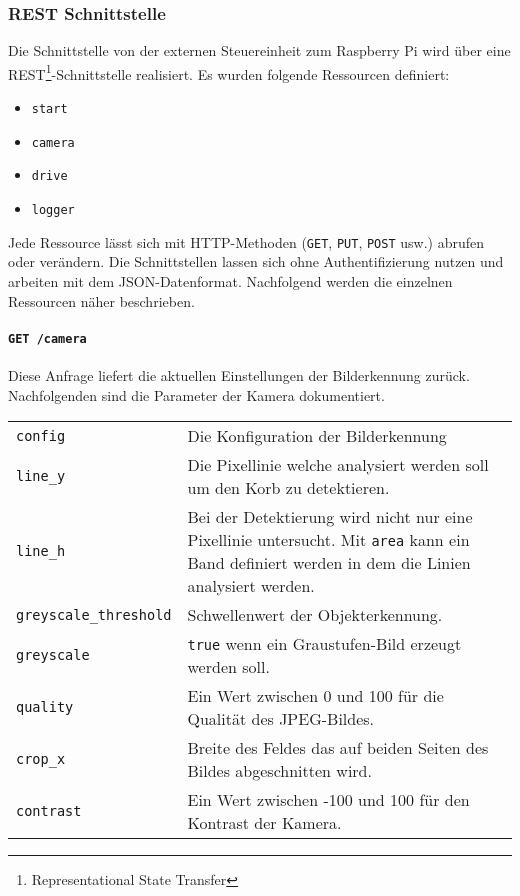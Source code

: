 \subsubsection{REST Schnittstelle}
\label{sec:rest-schnittstelle}

Die Schnittstelle von der externen Steuereinheit zum Raspberry Pi wird über eine REST\footnote{Representational State Transfer}-Schnittstelle realisiert. Es wurden folgende Ressourcen definiert:
\begin{itemize}
	\item \texttt{start}
	\item \texttt{camera}
	\item \texttt{drive}
	\item \texttt{logger}
\end{itemize}
Jede Ressource lässt sich mit HTTP-Methoden (\texttt{GET}, \texttt{PUT}, \texttt{POST} usw.) abrufen oder verändern. Die Schnittstellen lassen sich ohne Authentifizierung nutzen und arbeiten mit dem JSON-Datenformat. Nachfolgend werden die einzelnen Ressourcen näher beschrieben.

\paragraph{\texttt{GET /camera}}

Diese Anfrage liefert die aktuellen Einstellungen der Bilderkennung zurück. Nachfolgenden sind die Parameter der Kamera dokumentiert.
\label{tab:parameter-bilderkennung}
\begin{table}[h!]
	\begin{tabular}{l p{12cm}}
		\texttt{config} & Die Konfiguration der Bilderkennung \\
		\texttt{line\_y} & Die Pixellinie welche analysiert werden soll um den Korb zu detektieren. \\
		\texttt{line\_h} & Bei der Detektierung wird nicht nur eine Pixellinie untersucht. Mit \texttt{area} kann ein Band definiert werden in dem die Linien analysiert werden. \\
		\texttt{greyscale\_threshold} & Schwellenwert der Objekterkennung. \\
		\texttt{greyscale} & \texttt{true} wenn ein Graustufen-Bild erzeugt werden soll. \\
		\texttt{quality} & Ein Wert zwischen 0 und 100 für die Qualität des JPEG-Bildes. \\
		\texttt{crop\_x} & Breite des Feldes das auf beiden Seiten des Bildes abgeschnitten wird. \\
		\texttt{contrast} & Ein Wert zwischen -100 und 100 für den Kontrast der Kamera. \\
	\end{tabular}
	
\end{table}

